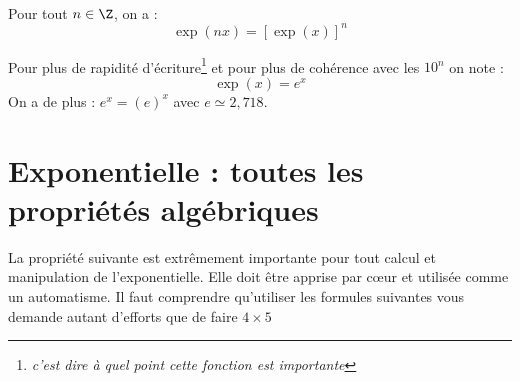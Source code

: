 \documentclass[12pt,fleqn]{report} %
\begin{document}
\begin{proposition}\text{ }\\
	Pour tout $n\in \Z$, on a :\[
	\exp(nx) = \left[\exp(x)\right]^n
	\]
\end{proposition}
\begin{remark}
	Pour plus de rapidité d'écriture\footnote{\textit{c'est dire à quel point cette fonction est importante}} et pour plus de cohérence avec les $10^n$ on note : 
	\[
	\exp(x) = e^x
	\]
	On a de plus : $e^x = (e)^x$ avec $e \simeq 2,718$.
	
\end{remark}

\section{Exponentielle : toutes les propriétés algébriques}

La propriété suivante est extrêmement importante pour tout calcul et manipulation de l'exponentielle. Elle doit être apprise par cœur et utilisée comme un automatisme. Il faut comprendre qu'utiliser les formules suivantes vous demande autant d'efforts que de faire $4\times 5$
\end{document}

